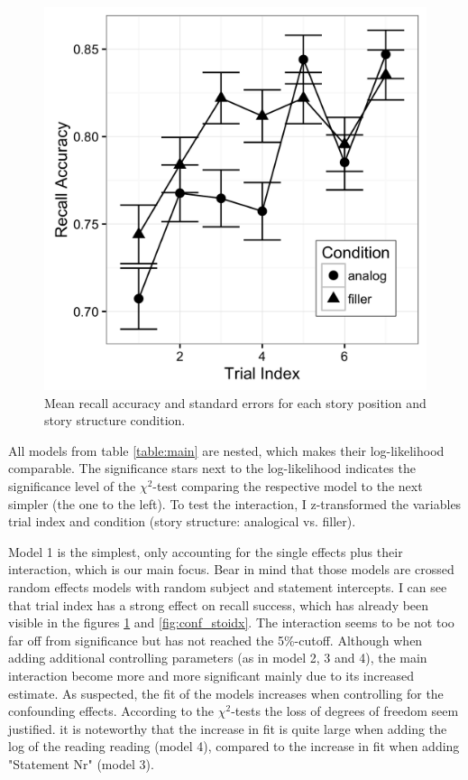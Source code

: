 \documentclass[a4paper,man,natbib,floatsintext,import]{apa6}
\begin{document}
\begin{figure}
\centering
\begin{minipage}[t]{.5\textwidth}
\includegraphics[width=.9\linewidth]{figures/main.png}
\caption{Mean recall accuracy and standard errors for each story position and story structure condition.}
\label{fig:main}
\end{minipage}
\end{figure}

All models from table \ref{table:main} are nested, which makes their log-likelihood comparable. The significance stars next to the log-likelihood indicates the significance level of the ${\chi}^2$-test comparing the respective model to the next simpler (the one to the left). To test the interaction, I z-transformed the variables trial index and condition (story structure: analogical vs. filler).

Model 1 is the simplest, only accounting for the single effects plus their interaction, which is our main focus. Bear in mind that those models are crossed random effects models with random subject and statement intercepts. I can see that trial index has a strong effect on recall success, which has already been visible in the figures \ref{fig:main} and \ref{fig:conf_stoidx}. The interaction seems to be not too far off from significance but has not reached the 5\%-cutoff. Although when adding additional controlling parameters (as in model 2, 3 and 4), the main interaction become more and more significant mainly due to its increased estimate. As suspected, the fit of the models increases when controlling for the confounding effects. According to the ${\chi}^2$-tests the loss of degrees of freedom seem justified. it is noteworthy that the increase in fit is quite large when adding the log of the reading reading (model 4), compared to the increase in fit when adding "Statement Nr" (model 3).
\end{document}
